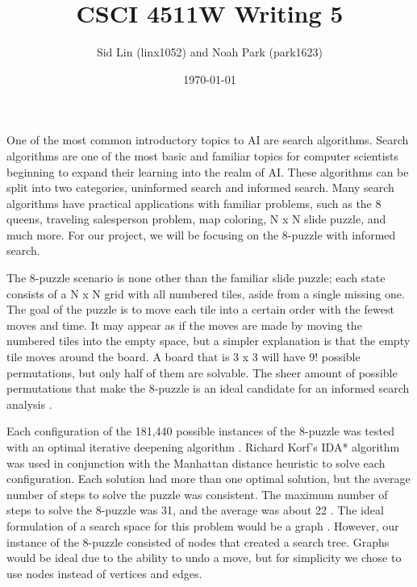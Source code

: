 \documentclass{article}
\title{CSCI 4511W Writing 5}
\date{\today}
\author{Sid Lin (linx1052) and Noah Park (park1623)}
\begin{document}
\maketitle

One of the most common introductory topics to AI are search algorithms. Search algorithms are one of the most basic and familiar topics for computer scientists beginning to expand their learning into the realm of AI. These algorithms can be split into two categories, uninformed search and informed search. Many search algorithms have practical applications with familiar problems, such as the 8 queens, traveling salesperson problem, map coloring, N x N slide puzzle, and much more. For our project, we will be focusing on the 8-puzzle with informed search.

The 8-puzzle scenario is none other than the familiar slide puzzle; each state consists of a N x N grid with all numbered tiles, aside from a single missing one. The goal of the puzzle is to move each tile into a certain order with the fewest moves and time. It may appear as if the moves are made by moving the numbered tiles into the empty space, but a simpler explanation is that the empty tile moves around the board. A board that is 3 x 3 will have 9! possible permutations, but only half of them are solvable. The sheer amount of possible permutations that make the 8-puzzle is an ideal candidate for an informed search analysis \cite{piltaver2012pathology}. 

Each configuration of the 181,440 possible instances of the 8-puzzle was tested with an optimal iterative deepening algorithm \cite{reinefeld1993complete}. Richard Korf's IDA* algorithm was used in conjunction with the Manhattan distance heuristic to solve each configuration. Each solution had more than one optimal solution, but the average number of steps to solve the puzzle was consistent. The maximum number of steps to solve the 8-puzzle was 31, and the average was about 22 \cite{reinefeld1993complete}. The ideal formulation of a search space for this problem would be a graph \cite{ratner1990n2}. However, our instance of the 8-puzzle consisted of nodes that created a search tree. Graphs would be ideal due to the ability to undo a move, but for simplicity we chose to use nodes instead of vertices and edges. 
\end{document}
